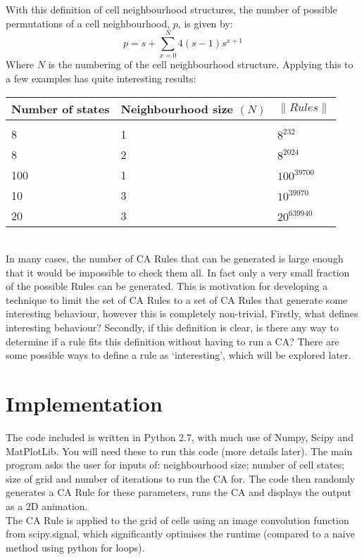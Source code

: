\documentclass{article}
\begin{document}
	With this definition of cell neighbourhood structures, the number of possible permutations of a cell neighbourhood, $p$, is given by:
	\begin{equation}
		p=s+\sum_{x=0}^{N}4(s-1)s^{x+1}
	\end{equation}
	Where $N$ is the numbering of the cell neighbourhood structure. Applying this to a few examples has quite interesting results:\\
	
	\begin{tabular}{|l|l|l|}
		\hline
		Number of states &Neighbourhood size $(N)$& $\|Rules\|$ \\ \hline\\[-1em]
		8& 1 & $8^{232}$\\ 
		8& 2 & $8^{2024}$\\
		100& 1 &$100^{39700}$\\
		10& 3 & $10^{39970}$\\ 
		20& 3 & $20^{639940}$\\ \hline
	\end{tabular}\\
	
	In many cases, the number of CA Rules that can be generated is large enough that it would be impossible to check them all. In fact only a very small fraction of the possible Rules can be generated. This is motivation for developing a technique to limit the set of CA Rules to a set of CA Rules that generate some interesting behaviour, however this is completely non-trivial. Firstly, what defines interesting behaviour? Secondly, if this definition is clear, is there any way to determine if a rule fits this definition without having to run a CA? There are some possible ways to define a rule as `interesting', which will be explored later.
	\newpage
	\section{Implementation}
	The code included is written in Python 2.7, with much use of Numpy, Scipy and MatPlotLib. You will need these to run this code (more details later). The main program asks the user for inputs of: neighbourhood size; number of cell states; size of grid and number of iterations to run the CA for. The code then randomly generates a CA Rule for these parameters, runs the CA and displays the output as a 2D animation.\\
	
	The CA Rule is applied to the grid of cells using an image convolution function from scipy.signal, which significantly optimises the runtime (compared to a naive method using python for loops).
	
\end{document}
